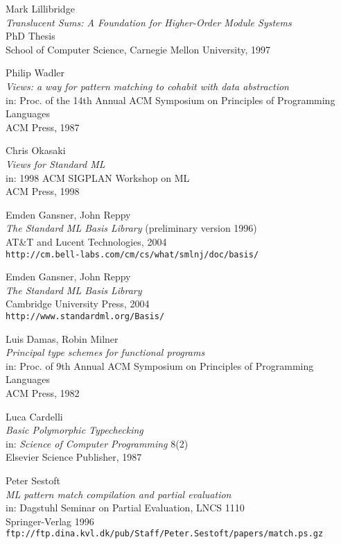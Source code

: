 \documentclass[twoside,titlepage]{article}
\begin{document}
\begin{appendix}
\begin{thebibliography}{MTHM97}
Mark Lillibridge \\
{\it Translucent Sums: A Foundation for Higher-Order Module Systems} \\
PhD Thesis \\
School of Computer Science, Carnegie Mellon University, 1997

Philip Wadler \\
{\it Views: a way for pattern matching to cohabit with data abstraction} \\
in: Proc. of the 14th Annual ACM Symposium on Principles of Programming Languages \\
ACM Press, 1987

Chris Okasaki \\
{\it Views for {Standard ML}} \\
in: 1998 ACM SIGPLAN Workshop on ML \\
ACM Press, 1998

Emden Gansner, John Reppy \\
{\it The Standard ML Basis Library}
(preliminary version 1996) \\
AT\&T and Lucent Technologies, 2004 \\
{\small\tt{http://cm.bell-labs.com/cm/cs/what/smlnj/doc/basis/}}

Emden Gansner, John Reppy \\
{\it The Standard ML Basis Library} \\
Cambridge University Press, 2004 \\
{\small\tt{http://www.standardml.org/Basis/}}

Luis Damas, Robin Milner \\
{\it Principal type schemes for functional programs} \\
in: Proc. of 9th Annual ACM Symposium on Principles of Programming Languages \\
ACM Press, 1982

Luca Cardelli \\
{\it Basic Polymorphic Typechecking} \\
in: {\it Science of Computer Programming} 8(2) \\
Elsevier Science Publisher, 1987

Peter Sestoft \\
{\it ML pattern match compilation and partial evaluation} \\
in: Dagstuhl Seminar on Partial Evaluation, LNCS 1110 \\
Springer-Verlag 1996 \\
{\small\tt{ftp://ftp.dina.kvl.dk/pub/Staff/Peter.Sestoft/papers/match.ps.gz}}


\end{thebibliography}
\end{appendix}
\end{document}
